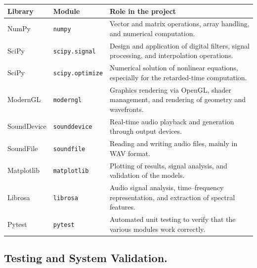 \documentclass[10.5pt]{article}
\begin{document}
	\begin{table}[H]
		\centering
		\label{tab:dependencias}
		\begin{tabular}{|l|l|p{10cm}|}
			\hline
			\textbf{Library} & \textbf{Module} & \textbf{Role in the project} \\ 
			\hline
			NumPy & \texttt{numpy} &
			Vector and matrix operations, array handling, and numerical computation. \\
			\hline
			SciPy & \texttt{scipy.signal} &
			Design and application of digital filters, signal processing, and interpolation operations. \\
			\hline
			SciPy & \texttt{scipy.optimize} &
			Numerical solution of nonlinear equations, especially for the retarded-time computation. \\
			\hline
			ModernGL & \texttt{moderngl} &
			Graphics rendering via OpenGL, shader management, and rendering of geometry and wavefronts. \\
			\hline
			SoundDevice & \texttt{sounddevice} &
			Real-time audio playback and generation through output devices. \\
			\hline
			SoundFile & \texttt{soundfile} &
			Reading and writing audio files, mainly in WAV format. \\
			\hline
			Matplotlib & \texttt{matplotlib} &
			Plotting of results, signal analysis, and validation of the models. \\
			\hline
			Librosa & \texttt{librosa} &
			Audio signal analysis, time--frequency representation, and extraction of spectral features. \\
			\hline
			Pytest & \texttt{pytest} &
			Automated unit testing to verify that the various modules work correctly. \\
			\hline
		\end{tabular}
	\end{table}
	
	\subsection{Testing and System Validation.}
	
\end{document}
